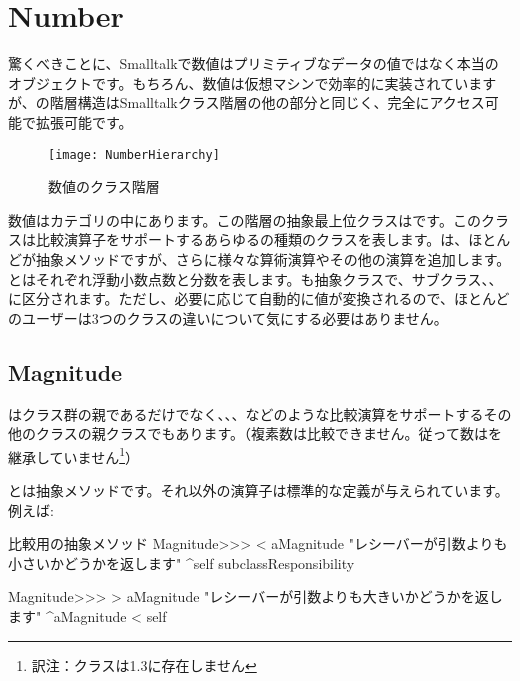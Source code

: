 \documentclass[a4paper,10pt,twoside]{book}
\begin{document}
\section{Number}
驚くべきことに、Smalltalkで数値はプリミティブなデータの値ではなく本当のオブジェクトです。もちろん、数値は仮想マシンで効率的に実装されていますが、の階層構造はSmalltalkクラス階層の他の部分と同じく、完全にアクセス可能で拡張可能です。

\begin{figure}[ht]
\centerline {\texttt{[image: NumberHierarchy]}}
\caption{数値のクラス階層 }
\end{figure}

数値はカテゴリの中にあります。この階層の抽象最上位クラスはです。このクラスは比較演算子をサポートするあらゆるの種類のクラスを表します。は、ほとんどが抽象メソッドですが、さらに様々な算術演算やその他の演算を追加します。とはそれぞれ浮動小数点数と分数を表します。も抽象クラスで、サブクラス、、に区分されます。ただし、必要に応じて自動的に値が変換されるので、ほとんどのユーザーは3つのクラスの違いについて気にする必要はありません。

\subsection{Magnitude}

はクラス群の親であるだけでなく、、、などのような比較演算をサポートするその他のクラスの親クラスでもあります。（複素数は比較できません。従って数はを継承していません\footnote{訳注：クラスは\pharo 1.3に存在しません}）

とは抽象メソッドです。それ以外の演算子は標準的な定義が与えられています。例えば:

\begin{method}{比較用の抽象メソッド}
Magnitude>>> < aMagnitude 
    "レシーバーが引数よりも小さいかどうかを返します"
    ^self subclassResponsibility

Magnitude>>> > aMagnitude 
    "レシーバーが引数よりも大きいかどうかを返します"
    ^aMagnitude < self
\end{method}
\end{document}

